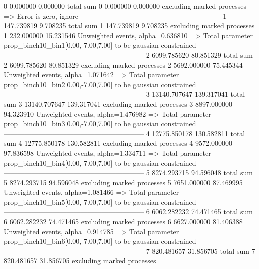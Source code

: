 0          0.000000        0.000000        total sum                     
0          0.000000        0.000000        excluding marked processes    
  => Error is zero, ignore      
------------------------------------------------------------
1          147.739819      9.708235        total sum                     
1          147.739819      9.708235        excluding marked processes    
1          232.000000      15.231546       Unweighted events, alpha=0.636810
  => Total parameter prop_binch10_bin1[0.00,-7.00,7.00] to be gaussian constrained
------------------------------------------------------------
2          6099.785620     80.851329       total sum                     
2          6099.785620     80.851329       excluding marked processes    
2          5692.000000     75.445344       Unweighted events, alpha=1.071642
  => Total parameter prop_binch10_bin2[0.00,-7.00,7.00] to be gaussian constrained
------------------------------------------------------------
3          13140.707647    139.317041      total sum                     
3          13140.707647    139.317041      excluding marked processes    
3          8897.000000     94.323910       Unweighted events, alpha=1.476982
  => Total parameter prop_binch10_bin3[0.00,-7.00,7.00] to be gaussian constrained
------------------------------------------------------------
4          12775.850178    130.582811      total sum                     
4          12775.850178    130.582811      excluding marked processes    
4          9572.000000     97.836598       Unweighted events, alpha=1.334711
  => Total parameter prop_binch10_bin4[0.00,-7.00,7.00] to be gaussian constrained
------------------------------------------------------------
5          8274.293715     94.596048       total sum                     
5          8274.293715     94.596048       excluding marked processes    
5          7651.000000     87.469995       Unweighted events, alpha=1.081466
  => Total parameter prop_binch10_bin5[0.00,-7.00,7.00] to be gaussian constrained
------------------------------------------------------------
6          6062.282232     74.471465       total sum                     
6          6062.282232     74.471465       excluding marked processes    
6          6627.000000     81.406388       Unweighted events, alpha=0.914785
  => Total parameter prop_binch10_bin6[0.00,-7.00,7.00] to be gaussian constrained
------------------------------------------------------------
7          820.481657      31.856705       total sum                     
7          820.481657      31.856705       excluding marked processes    
